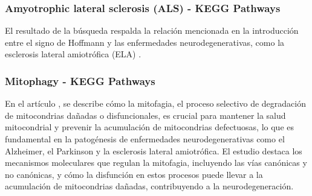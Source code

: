 \subsubsection{Amyotrophic lateral sclerosis (ALS) - KEGG Pathways}

El resultado de la búsqueda respalda la relación mencionada en la introducción entre el signo de Hoffmann y las enfermedades neurodegenerativas, como la esclerosis lateral amiotrófica (ELA) \cite{RIANCHO201927}.

\subsubsection{Mitophagy - KEGG Pathways}

En el artículo \cite{Zhang2022}, se describe cómo la mitofagia, el proceso selectivo de degradación de mitocondrias dañadas o disfuncionales, es crucial para mantener la salud mitocondrial y prevenir la acumulación de mitocondrias defectuosas, lo que es fundamental en la patogénesis de enfermedades neurodegenerativas como el Alzheimer, el Parkinson y la esclerosis lateral amiotrófica. El estudio destaca los mecanismos moleculares que regulan la mitofagia, incluyendo las vías canónicas y no canónicas, y cómo la disfunción en estos procesos puede llevar a la acumulación de mitocondrias dañadas, contribuyendo a la neurodegeneración.